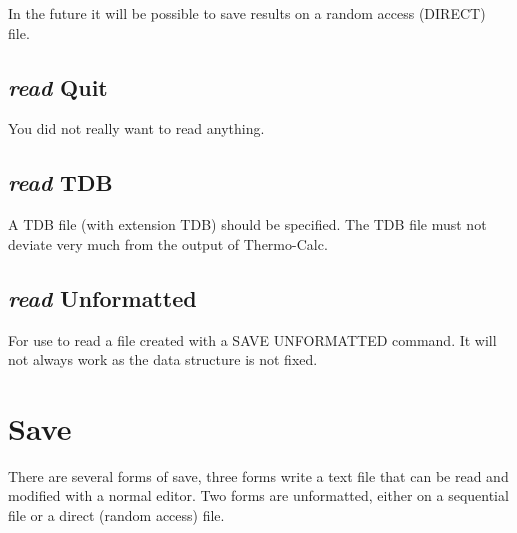 \documentclass[12pt]{article}
\begin{document}
In the future it will be possible to save results on a random access
(DIRECT) file.

\subsection{{\em read} Quit}

You did not really want to read anything.

\subsection{{\em read} TDB}

A TDB file (with extension TDB) should be specified.  The TDB file
must not deviate very much from the output of Thermo-Calc.

\subsection{{\em read} Unformatted}

For use to read a file created with a SAVE UNFORMATTED command.  It
will not always work as the data structure is not fixed.

\section{Save }

There are several forms of save, three forms write a text file that
can be read and modified with a normal editor.  Two forms are
unformatted, either on a sequential file or a direct (random access)
file.
\end{document}
